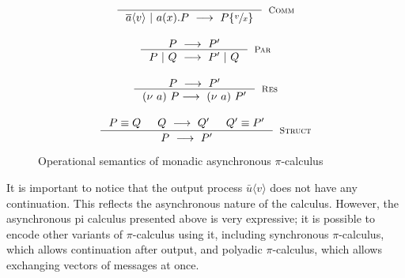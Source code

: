 \documentclass[12pt,twoside]{report}
\begin{document}
\begin{figure}[h!]
    \centering
    \begin{equation*}
    \centering
    \begin{array}{c}
    \inference{}{\overline{a}\langle v \rangle\ |\ a(x).P\ \longrightarrow\ P\{\sfrac{v}{x}\}}[\textsc{Comm}]\\[20pt]
    \inference{P\ \longrightarrow\ P'}{P\ |\ Q\ \longrightarrow\ P'\ |\ Q}[\textsc{Par}]\\[20pt]
    \inference{P\ \longrightarrow\ P'}{(\nu\ a)\ P \longrightarrow\ (\nu\ a)\ P'}[\textsc{Res}]\\[20pt]
    \inference{
        P \equiv Q 
        & Q\ \longrightarrow\ Q' 
        & Q' \equiv P'
    }{P\ \longrightarrow\ P'}[\textsc{Struct}]
    \end{array}
    \end{equation*}
    \caption{Operational semantics of monadic asynchronous $\pi$-calculus}
    \label{picalc_op_sem}
\end{figure}{}

It is important to notice that the output process $\bar{u} \langle v \rangle$ does not have any continuation. This reflects the asynchronous nature of the calculus. However, the asynchronous pi calculus presented above is very expressive; it is possible to encode other variants of $\pi$-calculus using it, including synchronous $\pi$-calculus, which allows continuation after output, and polyadic $\pi$-calculus, which allows exchanging vectors of messages at once. 


         
\end{document}
